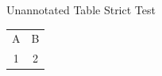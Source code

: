 \documentclass[14pt,t,strict]{beamer-accessibility}
\begin{document}
\begin{frame}{Unannotated Table Strict Test}
\begin{tabular}{cc}
A & B \\
1 & 2 \\
\end{tabular}
\end{frame}
\end{document}
